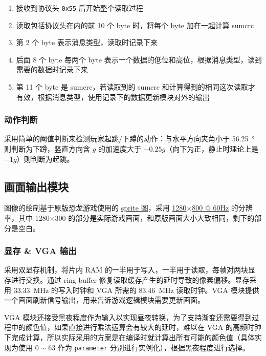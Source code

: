 \documentclass[UTF8, 11pt, fontset=none]{ctexart}
\begin{document}
\begin{enumerate}
    \item 接收到协议头 \texttt{0x55} 后开始整个读取过程
    \item 读取包括协议头在内的前 10 个 byte 时，将每个 byte 加在一起计算 sumcrc
    \item 第 2 个 byte 表示消息类型，读取时记录下来
    \item 后面 8 个 byte 每两个 byte 表示一个数据的低位和高位，根据消息类型，读到需要的数据时记录下来
    \item 第 11 个 byte 是 sumcrc，若读取到的 sumcrc 和计算得到的相同这次读取才有效，根据消息类型，使用记录下的数据更新模块对外的输出
\end{enumerate}

\subsubsection{动作判断}

采用简单的阈值判断来检测玩家起跳/下蹲的动作：与水平方向夹角小于 \SI{56.25}{\degree} 则判断为下蹲，竖直方向含 $g$ 的加速度大于 $-0.25 g$（向下为正，静止时理论上是 $-1g$）则判断为起跳。

\subsection{画面输出模块}

图像的绘制基于原版恐龙游戏使用的 \href{https://github.com/chromium/chromium/blob/3b31f1cbd28e0a1199defe6f6b37001cef4c4790/components/neterror/resources/images/default_200_percent/offline/200-offline-sprite.png}{sprite 图}，采用 \href{http://tinyvga.com/vga-timing/1280x800@60Hz}{1280$\times$800 @ 60Hz} 的分辨率，其中 1280$\times$300 的部分是实际游戏画面，和原版画面大小大致相同，剩下的部分是空白。

\subsubsection{显存 \& VGA 输出}

采用双显存机制，将片内 RAM 的一半用于写入，一半用于读取，每帧对两块显存进行交换。通过 ring buffer 修复读取缓存产生的延时导致的像素偏移。显存采用 \SI{33.33}{\mega\hertz} 的写入时钟和 VGA 所需的 \SI{83.46}{\mega\hertz} 读取时钟。VGA 模块提供一个画面刷新信号输出，用来告诉游戏逻辑模块需要更新画面。

VGA 模块还接受黑夜程度作为输入以实现昼夜转换，为了支持渐变还需要得到过程中的颜色值，如果直接进行乘法运算会有较大的延时，难以在 VGA 的高频时钟下完成计算，所以实际采用的方案是在编译时就计算出所有可能的颜色值（具体实现为使用 $0 \sim 63$ 作为 \texttt{parameter} 分别进行实例化），根据黑夜程度进行选择。
\end{document}
